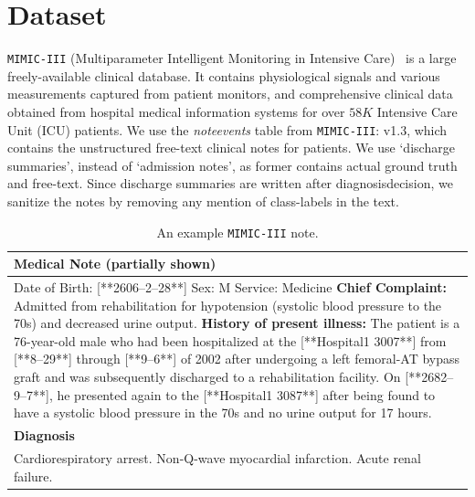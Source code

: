 \section{Dataset}
    \texttt{\texttt{MIMIC-III}} (Multiparameter Intelligent Monitoring in Intensive Care)~\cite{johnson2016mimic} is a large freely-available clinical database. It contains physiological signals and various measurements captured from patient monitors, and comprehensive clinical data obtained from hospital medical information systems for over $58K$ Intensive Care Unit (ICU) patients.  We use the \emph{noteevents} table from \texttt{\texttt{MIMIC-III}}: v1.3, which contains the unstructured free-text clinical notes for patients. We use `discharge summaries', instead of `admission notes', as former contains actual ground truth and free-text. Since discharge summaries are written after diagnosisdecision, we sanitize the notes by removing any mention of class-labels in the text.


\begin{table}
    \small
    \centering
\label{mimic-ii}
    \def\arraystretch{1.5}
    \begin{tabularx}{8.5cm}{X}
    \midrule
    \textbf{Medical Note} (partially shown) \\
    \midrule
    Date of Birth:   {\tiny [**2606--2--28**] }     Sex:  M \newline
    Service:  Medicine \newline
    \textbf{Chief Complaint:} \newline
    Admitted from rehabilitation for
    hypotension (systolic blood pressure to the 70s) and
    decreased urine output.
    \textbf{History of present illness:} \newline
    The patient is a 76-year-old male who had
    been hospitalized at the {\tiny[**Hospital1 3007**]} from {\tiny[**8--29**]} through {\tiny[**9--6**]} of 2002
    after undergoing a left femoral-AT bypass graft and was
    subsequently discharged to a rehabilitation facility. \newline
    On {\tiny[**2682--9--7**]}, he presented again to the {\tiny[**Hospital1 3087**]}
    after being found to have a systolic
    blood pressure in the 70s and no urine output for 17 hours.\\
    
    \midrule
    \textbf{Diagnosis} \\
    \midrule
    Cardiorespiratory arrest. \newline
    Non-Q-wave myocardial infarction. \newline
    Acute renal failure. \\
    \midrule
    \end{tabularx}
    \caption[Sample MIMIC note]{An example \texttt{\texttt{MIMIC-III}} note.}
\end{table}


